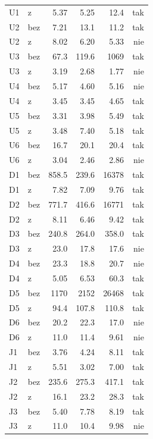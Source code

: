 \begin{tabular}{llrrrr}
U1 & z & \num{5.37} & \num{5.25} & \num{12.4} & tak \\
U2 & bez & \num{7.21} & \num{13.1} & \num{11.2} & tak \\
U2 & z & \num{8.02} & \num{6.20} & \num{5.33} & nie \\
U3 & bez & \num{67.3} & \num{119.6} & \num{1069} & tak \\
U3 & z & \num{3.19} & \num{2.68} & \num{1.77} & nie \\
U4 & bez & \num{5.17} & \num{4.60} & \num{5.16} & nie \\
U4 & z & \num{3.45} & \num{3.45} & \num{4.65} & tak \\
U5 & bez & \num{3.31} & \num{3.98} & \num{5.49} & tak \\
U5 & z & \num{3.48} & \num{7.40} & \num{5.18} & tak \\
U6 & bez & \num{16.7} & \num{20.1} & \num{20.4} & tak \\
U6 & z & \num{3.04} & \num{2.46} & \num{2.86} & nie \\
D1 & bez & \num{858.5} & \num{239.6} & \num{16378} & tak \\
D1 & z & \num{7.82} & \num{7.09} & \num{9.76} & tak \\
D2 & bez & \num{771.7} & \num{416.6} & \num{16771} & tak \\
D2 & z & \num{8.11} & \num{6.46} & \num{9.42} & tak \\
D3 & bez & \num{240.8} & \num{264.0} & \num{358.0} & tak \\
D3 & z & \num{23.0} & \num{17.8} & \num{17.6} & nie \\
D4 & bez & \num{23.3} & \num{18.8} & \num{20.7} & nie \\
D4 & z & \num{5.05} & \num{6.53} & \num{60.3} & tak \\
D5 & bez & \num{1170} & \num{2152} & \num{26468} & tak \\
D5 & z & \num{94.4} & \num{107.8} & \num{110.8} & tak \\
D6 & bez & \num{20.2} & \num{22.3} & \num{17.0} & nie \\
D6 & z & \num{11.0} & \num{11.4} & \num{9.61} & nie \\
J1 & bez & \num{3.76} & \num{4.24} & \num{8.11} & tak \\
J1 & z & \num{5.51} & \num{3.02} & \num{7.00} & tak \\
J2 & bez & \num{235.6} & \num{275.3} & \num{417.1} & tak \\
J2 & z & \num{16.1} & \num{23.2} & \num{28.3} & tak \\
J3 & bez & \num{5.40} & \num{7.78} & \num{8.19} & tak \\
J3 & z & \num{11.0} & \num{10.4} & \num{9.98} & nie \\
\bottomrule
\end{tabular}
